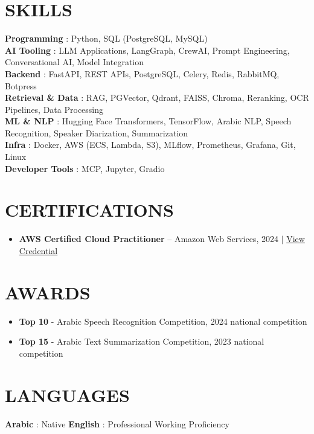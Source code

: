 \documentclass[letterpaper,11pt]{article}
\newcommand{\resumeItem}[1]{
  \item\small{
    {#1 \vspace{-1pt}}
  }
}
\begin{document}
\section{SKILLS}
 \begin{itemize}[leftmargin=0in, label={}]
    \small{\item{
     \textbf{Programming} {: Python, SQL (PostgreSQL, MySQL)}\vspace{2pt} \\
     \textbf{AI Tooling} {: LLM Applications, LangGraph, CrewAI, Prompt Engineering, Conversational AI, Model Integration}\vspace{2pt} \\
     \textbf{Backend} {: FastAPI, REST APIs, PostgreSQL, Celery, Redis, RabbitMQ, Botpress}\vspace{2pt} \\
     \textbf{Retrieval \& Data} {: RAG, PGVector, Qdrant, FAISS, Chroma, Reranking, OCR Pipelines, Data Processing}\vspace{2pt} \\
     \textbf{ML \& NLP} {: Hugging Face Transformers, TensorFlow, Arabic NLP, Speech Recognition, Speaker Diarization, Summarization}\vspace{2pt} \\
     \textbf{Infra} {: Docker, AWS (ECS, Lambda, S3), MLflow, Prometheus, Grafana, Git, Linux}\vspace{2pt} \\
     \textbf{Developer Tools} {: MCP, Jupyter, Gradio}
    }}
 \end{itemize}

\section{CERTIFICATIONS}
\begin{itemize}[leftmargin=0.15in]
  \resumeItem{\textbf{AWS Certified Cloud Practitioner} -- Amazon Web Services, 2024 \textnormal{\small $|$ \href{https://www.linkedin.com/posts/ahm215_aws-certified-cloud-practitioner-was-issued-activity-7274436150700769281-TAJd}{View Credential}}}
\end{itemize}

\section{AWARDS}
\begin{itemize}[leftmargin=0.15in]
  \resumeItem{\textbf{Top 10} - Arabic Speech Recognition Competition, 2024 national competition}
  \resumeItem{\textbf{Top 15} - Arabic Text Summarization Competition, 2023 national competition}
\end{itemize}

\section{LANGUAGES}
 \begin{itemize}[leftmargin=0in, label={}]
    \small{\item{
     \textbf{Arabic} {: Native} \hspace{24pt}
     \textbf{English} {: Professional Working Proficiency}
    }}
 \end{itemize}
\end{document}
